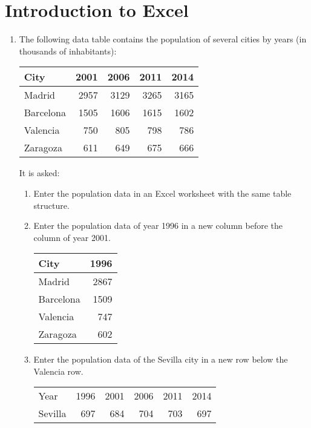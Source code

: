 
\section{Introduction to Excel}
\begin{enumerate}[leftmargin=*]
\item The following data table contains the population of several cities by years (in thousands of inhabitants):
\begin{center} 
\begin{tabular}{lrrrr}
\toprule 
City & 	2001 & 2006 & 2011 & 2014\\
\midrule
Madrid & 2957 & 3129 & 3265 & 3165\\
Barcelona & 1505 & 1606 & 1615 & 1602 \\ 
Valencia & 750 & 805 & 798 & 786\\
Zaragoza & 611 & 649 & 675 & 666\\
\bottomrule
\end{tabular}
\end{center}

It is asked:

\begin{enumerate}
\item Enter the population data in an Excel worksheet with the same table structure.
\item Enter the population data of year 1996 in a new column before the column of year 2001.
\begin{center} 
\begin{tabular}{lr}
\toprule 
City & 	1996\\
\midrule
Madrid & 2867\\
Barcelona & 1509\\
Valencia & 747\\
Zaragoza & 602\\
\bottomrule
\end{tabular}
\end{center}

\item Enter the population data of the Sevilla city in a new row below the Valencia row. 
\begin{center} 
\begin{tabular}{lrrrrr}
\toprule 
Year & 	1996 & 2001 & 2006 & 2011 & 2014\\
Sevilla & 697 & 684 & 704 & 703 & 697\\
\bottomrule
\end{tabular}
\end{center}


\end{enumerate}
\end{enumerate}
